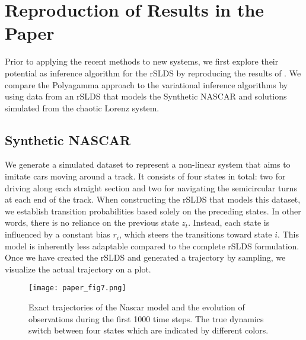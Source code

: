 
\section{Reproduction of Results in the Paper}

Prior to applying the recent methods to new systems, we first explore their potential as inference algorithm for the rSLDS by reproducing the results of \cite{linderman_bayesian_2017}. We compare the Polyagamma approach to the variational inference algorithms by using data from an rSLDS that models the Synthetic NASCAR and solutions simulated from the chaotic Lorenz system.

\subsection{Synthetic NASCAR}

We generate a simulated dataset to represent a non-linear system that aims to imitate cars moving around a track. It consists of four states in total: two for driving along each straight section and two for navigating the semicircular turns at each end of the track. When constructing the rSLDS that models this dataset, we establish transition probabilities based solely on the preceding states. In other words, there is no reliance on the previous state $z_t$. Instead, each state is influenced by a constant bias $r_i$, which steers the transitions toward state $i$. This model is inherently less adaptable compared to the complete rSLDS formulation. Once we have created the rSLDS and generated a trajectory by sampling, we visualize the actual trajectory on a plot.
\begin{figure}[h!]
	\centering
	\texttt{[image: paper\_fig7.png]}
	\caption{Exact trajectories of the Nascar model and the evolution of observations during the first 1000 time steps. The true dynamics switch between four states which are indicated by different colors.}
	\label{trueNascar}
\end{figure}

